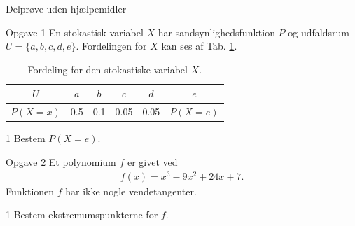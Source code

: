 
\begin{center}
\LARGE
Delprøve uden hjælpemidler 
\end{center}
\begin{opgavetekst}{Opgave 1}
	En stokastisk variabel $X$ har sandsynlighedsfunktion $P$ og udfaldsrum  \\
	$U = \{a,b,c,d,e\}$. Fordelingen for $X$ 
	kan ses af Tab. \ref{tab:fordeling}.
	\begin{table}[H]
		\centering
		\begin{tabular}{c|c|c|c|c|c}
			$U$ & $a$ & $b$ &  $c$ & $d$ & $e$ \\
			\hline
			$P(X=x)$ & 0.5 & 0.1 & 0.05 & 0.05 & $P(X=e)$
		\end{tabular}
		\caption{Fordeling for den stokastiske variabel $X$. }
		\label{tab:fordeling}		
	\end{table}
	\phantom{h}
\end{opgavetekst}
	\begin{delopgave}{}{1}
		Bestem $P(X=e)$.
	\end{delopgave}

\begin{opgavetekst}{Opgave 2}
	Et polynomium $f$ er givet ved
	\begin{align*}
		f(x) = x^3-9x^2+24x+7.
	\end{align*}
	Funktionen $f$ har ikke nogle vendetangenter.
\end{opgavetekst}
\begin{delopgave}{}{1}
	Bestem ekstremumspunkterne for $f$. 
\end{delopgave}

